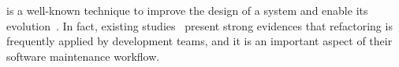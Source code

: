 



% 
% 
% 
% 
 is a well-known technique to improve the design of a system and enable its evolution~\cite{Fowler:1999}.
In fact, existing studies~\cite{MurphyHill2012, tsantalis_empiricalstudy, Kim:2012:FSE, kim-tse-2014, fse2016-why-we-refactor} present strong evidences that refactoring is frequently applied by development teams, and it is an important aspect of their software maintenance workflow.


